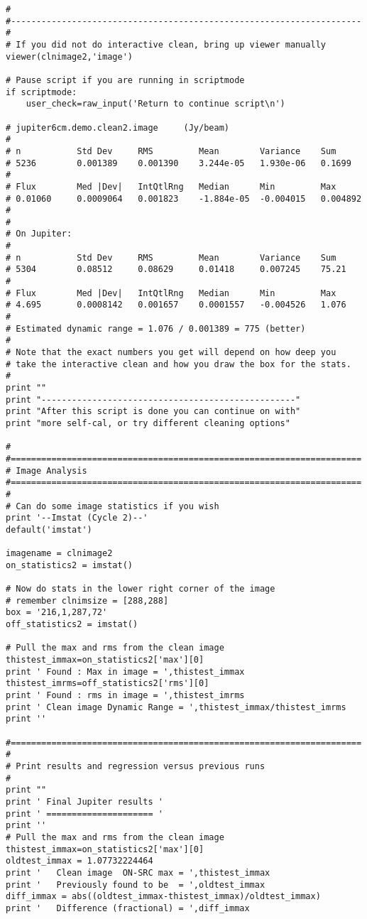\begin{verbatim}
#
#---------------------------------------------------------------------
#
# If you did not do interactive clean, bring up viewer manually
viewer(clnimage2,'image')

# Pause script if you are running in scriptmode
if scriptmode:
    user_check=raw_input('Return to continue script\n')

# jupiter6cm.demo.clean2.image     (Jy/beam)
# 
# n           Std Dev     RMS         Mean        Variance    Sum
# 5236        0.001389    0.001390    3.244e-05   1.930e-06   0.1699    
# 
# Flux        Med |Dev|   IntQtlRng   Median      Min         Max
# 0.01060     0.0009064   0.001823    -1.884e-05  -0.004015   0.004892  
# 
# 
# On Jupiter:
# 
# n           Std Dev     RMS         Mean        Variance    Sum
# 5304        0.08512     0.08629     0.01418     0.007245    75.21     
# 
# Flux        Med |Dev|   IntQtlRng   Median      Min         Max
# 4.695       0.0008142   0.001657    0.0001557   -0.004526   1.076     
#
# Estimated dynamic range = 1.076 / 0.001389 = 775 (better)
#
# Note that the exact numbers you get will depend on how deep you
# take the interactive clean and how you draw the box for the stats.
#
print ""
print "--------------------------------------------------"
print "After this script is done you can continue on with"
print "more self-cal, or try different cleaning options"

#
#=====================================================================
# Image Analysis
#=====================================================================
#
# Can do some image statistics if you wish
print '--Imstat (Cycle 2)--'
default('imstat')

imagename = clnimage2
on_statistics2 = imstat()

# Now do stats in the lower right corner of the image
# remember clnimsize = [288,288]
box = '216,1,287,72'
off_statistics2 = imstat()

# Pull the max and rms from the clean image
thistest_immax=on_statistics2['max'][0]
print ' Found : Max in image = ',thistest_immax
thistest_imrms=off_statistics2['rms'][0]
print ' Found : rms in image = ',thistest_imrms
print ' Clean image Dynamic Range = ',thistest_immax/thistest_imrms
print ''

#=====================================================================
#
# Print results and regression versus previous runs
#
print ""
print ' Final Jupiter results '
print ' ===================== '
print ''
# Pull the max and rms from the clean image
thistest_immax=on_statistics2['max'][0]
oldtest_immax = 1.07732224464
print '   Clean image  ON-SRC max = ',thistest_immax
print '   Previously found to be  = ',oldtest_immax
diff_immax = abs((oldtest_immax-thistest_immax)/oldtest_immax)
print '   Difference (fractional) = ',diff_immax


\end{verbatim}
